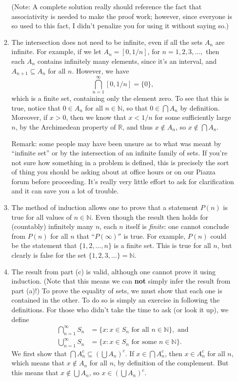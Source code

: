 \documentclass[12pt,letterpaper]{article}
\begin{document}
\begin{enumerate}
\begin{enumerate}
(Note: A complete solution really should reference the fact that associativity is needed to make the proof work; however, since everyone is so used to this fact, I didn't penalize you for using it without saying so.)
\item The intersection does not need to be infinite, even if all the sets $A_n$ are infinite. For example, if we let $A_n=[0,1/n]$, for $n=1,2,3,\ldots, $ then each $A_n$ contains infinitely many elements, since it's an interval, and $A_{n+1}\subseteq A_n$ for all $n$. However, we have
\[
\bigcap_{n=1}^\infty [0,1/n] = \{0\},
\]
which is a finite set, containing only the element zero. To see that this is true, notice that $0\in A_n$ for all $n\in\mathbb{N}$, so that $0\in \bigcap A_n$ by definition. Moreover, if $x>0$, then we know that $x<1/n$ for some sufficiently large $n$, by the Archimedean property of $\mathbb{R}$, and thus $x\notin A_n$, so $x\notin \bigcap A_n$. 

Remark: some people may have been unsure as to what was meant by ``infinite set'' or by the intersection of an infinite family of sets. If you're not sure how something in a problem is defined, this is precisely the sort of thing you should be asking about at office hours or on our Piazza forum before proceeding. It's really very little effort to ask for clarification and it can save you a lot of trouble.

\item The method of induction allows one to prove that a statement $P(n)$ is true for all values of $n\in\mathbb{N}$. Even though the result then holds for (countably) infinitely many $n$, each $n$ itself is {\em finite}: one cannot conclude from $P(n)$ for all $n$ that ``$P(\infty)''$ is true. For example, $P(n)$ could be the statement that $\{1,2,\ldots, n\}$ is a finite set. This is true for all $n$, but clearly is false for the set $\{1,2,3,\ldots\} = \mathbb{N}$.

\item The result from part (c) is valid, although one cannot prove it using induction. (Note that this means we can {\bf not} simply infer the result from part (a)!) To prove the equality of sets, we must show that each one is contained in the other. To do so is simply an exercise in following the definitions. For those who didn't take the time to ask (or look it up), we define
\begin{align*}
\bigcap_{n=1}^\infty S_n & = \{x : x\in S_n \text{ for all } n\in\mathbb{N}\}, \text{ and}\\
\bigcup_{n=1}^\infty S_n & = \{x : x\in S_n \text{ for some } n\in\mathbb{N}\}.
\end{align*}
We first show that $\bigcap A_n^c\subseteq \left(\bigcup A_n\right)^c$. If $x\in \bigcap A_n^c$, then $x\in A_n^c$ for all $n$, which means that $x\notin A_n$ for all $n$, by definition of the complement. But this means that $x\notin \bigcup A_n$, so $x\in \left(\bigcup A_n\right)^c$.


\end{enumerate}
\end{enumerate}
\end{document}
